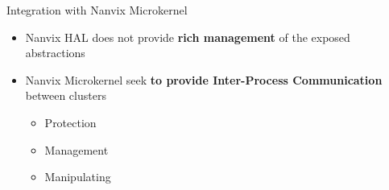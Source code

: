 		\begin{frame}[fragile]{Integration with Nanvix Microkernel}
			\begin{itemize}
				\item Nanvix HAL does not provide \textbf{rich management} of the exposed abstractions
				\item Nanvix Microkernel seek \textbf{to provide Inter-Process Communication} between clusters
				\begin{itemize}
					\item Protection
					\item Management
					\item Manipulating
				\end{itemize}
			\end{itemize}


		\end{frame}


